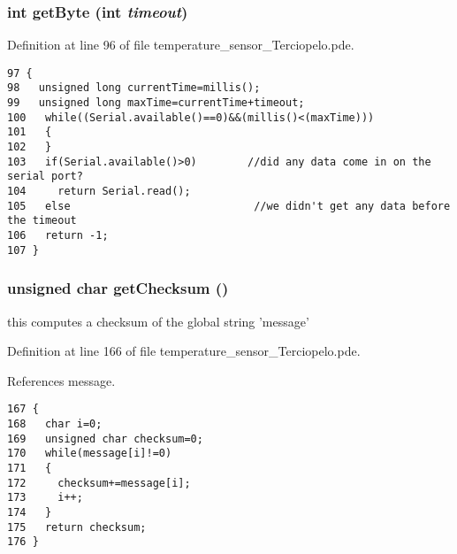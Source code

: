 \hypertarget{applet_2temperature__sensor___terciopelo_8pde_f8c68e93feeba5b9244094043672bac0}{
\subsubsection[{getByte}]{\setlength{\rightskip}{0pt plus 5cm}int getByte (int {\em timeout})}}
\label{applet_2temperature__sensor___terciopelo_8pde_f8c68e93feeba5b9244094043672bac0}




Definition at line 96 of file temperature\_\-sensor\_\-Terciopelo.pde.

\begin{Code}\begin{verbatim}97 {
98   unsigned long currentTime=millis();
99   unsigned long maxTime=currentTime+timeout;
100   while((Serial.available()==0)&&(millis()<(maxTime)))
101   {
102   }
103   if(Serial.available()>0)        //did any data come in on the serial port?
104     return Serial.read();
105   else                             //we didn't get any data before the timeout
106   return -1;
107 }
\end{verbatim}
\end{Code}


\hypertarget{applet_2temperature__sensor___terciopelo_8pde_465a79dc430d1e52a5b540920da744ca}{
\subsubsection[{getChecksum}]{\setlength{\rightskip}{0pt plus 5cm}unsigned char getChecksum ()}}
\label{applet_2temperature__sensor___terciopelo_8pde_465a79dc430d1e52a5b540920da744ca}


this computes a checksum of the global string 'message' 



Definition at line 166 of file temperature\_\-sensor\_\-Terciopelo.pde.

References message.

\begin{Code}\begin{verbatim}167 {
168   char i=0;
169   unsigned char checksum=0;
170   while(message[i]!=0)
171   {
172     checksum+=message[i];
173     i++;
174   }
175   return checksum;
176 }
\end{verbatim}
\end{Code}


